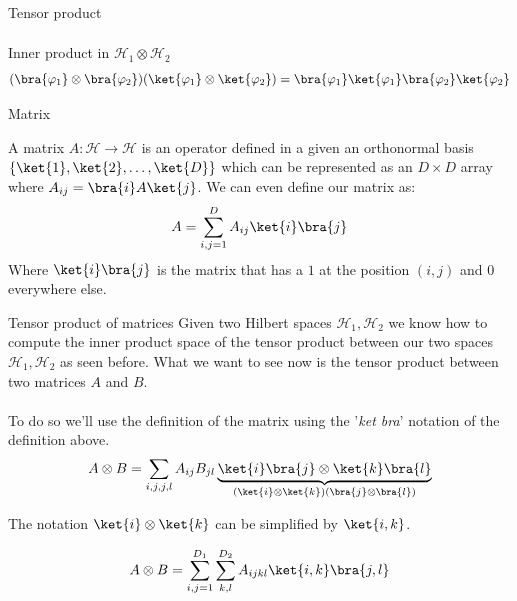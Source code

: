 \begin{parag}{Tensor product}
\begin{align*}
	\end{align*}
	\begin{subparag}{Inner product in $\mathcal{H}_1 \otimes \mathcal{H}_2$}
		\begin{align*} 
			\left(\bra{\phi_1} \otimes \bra{\phi_2}\right) \left(\ket{\phi_1} \otimes \ket{\phi_2}\right) = \bra{\phi_1}\ket{\varphi_1}\bra{\phi_2}\ket{\phi_2}
		\end{align*}
	\end{subparag}
\end{parag}



\begin{parag}{Matrix}
	\begin{definition}
    A matrix $A : \mathcal{H} \to \mathcal{H}$ is an operator defined in a given an orthonormal basis $\left\{\ket{1}, \ket{2}, \ldots, \ket{D}\right\}$ which can be represented as an $D \times D$ array where $A_{ij} =  \bra{i}A\ket{j}$. We can even define our matrix as:
	\begin{align*} 
		A =  \sum_{i, j = 1}^{D} A_{ij}\ket{i}\bra{j}
	\end{align*}
	Where $\ket{i}\bra{j}$ is the matrix that has a $1$ at the position $\left(i, j\right)$ and $0$ everywhere else.
 	\end{definition}
	\begin{subparag}{Tensor product of matrices}
	    Given two Hilbert spaces $\mathcal{H}_1, \mathcal{H}_2$ we know how to compute the inner product space of the tensor product between our two spaces $\mathcal{H}_1, \mathcal{H}_2$ as seen before. What we want to see now is the tensor product between two matrices $A$ and $B$.\\
		$ $\\
		To do so we'll use the definition of the matrix using the '\textit{ket bra}' notation of the definition above.
		\begin{align*} 
			A \otimes B = \sum_{i, j, j, l} A_{ij} B_{jl } \underbrace{\ket{i}\bra{j}  \otimes \ket{k}\bra{l}}_{\left(\ket{i} \otimes \ket{k}\right)\left(\bra{j} \otimes \bra{l}\right)}
		\end{align*}
		\begin{framedremark}
		The notation $\ket{i} \otimes \ket{k}$ can be simplified by $\ket{i, k}$.
		\end{framedremark}
		\begin{align*} 
			A \otimes B &= \sum_{i, j = 1}^{D_1}\sum_{k, l}^{D_2} A_{ijkl} \ket{i, k} \bra{j, l}\\
		\end{align*}

\end{subparag}
\end{parag}
